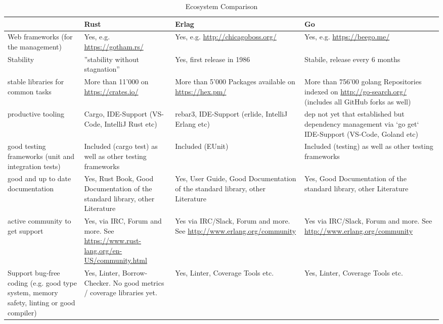 \begin{sidewaystable}
	\centering
	\caption{Ecosystem Comparison}
	\label{language-comparison-eco-system}
	\begin{tabu}{X|X X X}
		\hline
		& Rust
		& Erlag
		& Go
		\\ \hline

		Web frameworks (for the management)
		& Yes, e.g. \url{https://gotham.rs/}
		& Yes, e.g. \url{http://chicagoboss.org/}
		& Yes, e.g. \url{https://beego.me/}
		\\
		
		Stability
		& ''stability without stagnation'' \cite{rust-blog-stability}
		& Yes, first release in 1986 \cite{erlang-org}
		& Stabile, release every 6 months \cite{go-github-release-cycle}
		\\
		
		stable libraries for common tasks
		& More than 11'000 on \url{https://crates.io/}
		& More than 5'000 Packages available on \url{https://hex.pm/}
		& More than 756'00 golang Repositories indexed on \url{http://go-search.org/} (includes all GitHub forks as well)
		\\
		
		productive tooling
		& Cargo, IDE-Support (VS-Code, IntelliJ Rust etc)
		& rebar3, IDE-Support (erlide, IntelliJ Erlang etc)
		& dep not yet that established but dependency management via `go get` IDE-Support (VS-Code, Goland etc)
		\\
		
		good testing frameworks (unit and integration tests)
		& Included (cargo test) as well as other testing frameworks
		& Included (EUnit)
		& Included (testing) as well as other testing frameworks
		\\
		
		good and up to date documentation
		& Yes, Rust Book, Good Documentation of the standard library, other Literature
		& Yes, User Guide, Good Documentation of the standard library, other Literature
		& Yes, Good Documentation of the standard library, other Literature
		\\
		
		active community to get support
		& Yes, via IRC, Forum and more. See \url{https://www.rust-lang.org/en-US/community.html}
		& Yes via IRC/Slack, Forum and more. See \url{http://www.erlang.org/community}
		& Yes via IRC/Slack, Forum and more. See \url{http://www.erlang.org/community}
		\\
		
		Support bug-free coding (e.g. good type system, memory safety, linting or good compiler)
		& Yes, Linter, Borrow-Checker. No good metrics / coverage libraries yet.
		& Yes, Linter, Coverage Tools etc.
		& Yes, Linter, Coverage Tools etc.
	\end{tabu}
\end{sidewaystable}

